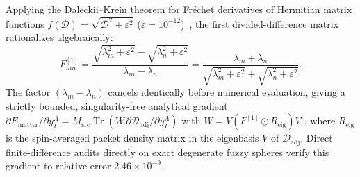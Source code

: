 \documentclass[11pt,a4paper]{article}
\DeclareMathOperator{\Tr}{Tr}
\begin{document}
Applying the Daleckii--Krein theorem for Fr\'echet derivatives of Hermitian matrix functions $f(\mathcal{D}) = \sqrt{\mathcal{D}^2 + \varepsilon^2}$ ($\varepsilon = 10^{-12}$)~\cite{Bhatia1997}, the first divided-difference matrix rationalizes algebraically:
\begin{equation}
  F^{[1]}_{mn}
  = \frac{\sqrt{\lambda_m^2 + \varepsilon^2} - \sqrt{\lambda_n^2 + \varepsilon^2}}{\lambda_m - \lambda_n}
  = \frac{\lambda_m + \lambda_n}{\sqrt{\lambda_m^2 + \varepsilon^2} + \sqrt{\lambda_n^2 + \varepsilon^2}}.
  \label{eq:dk_grad}
\end{equation}
The factor $(\lambda_m - \lambda_n)$ cancels identically before numerical evaluation, giving a strictly bounded, singularity-free analytical gradient $\partial E_{\mathrm{matter}}/\partial y_I^A = M_{\mathrm{src}}\Tr(W\,\partial \mathcal{D}_{\mathrm{adj}}/\partial y_I^A)$ with $W = V (F^{[1]} \odot R_{\mathrm{eig}}) V^\dagger$, where $R_{\mathrm{eig}}$ is the spin-averaged packet density matrix in the eigenbasis $V$ of $\mathcal{D}_{\mathrm{adj}}$. Direct finite-difference audits directly on exact degenerate fuzzy spheres verify this gradient to relative error $2.46\times 10^{-9}$.
\end{document}
